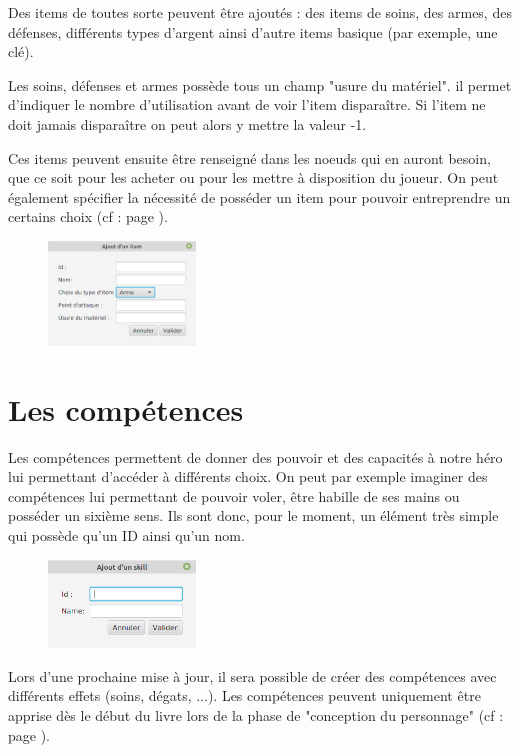 		Des items de toutes sorte peuvent être ajoutés : des items de soins, des armes, des défenses, différents types d'argent ainsi d'autre items basique (par exemple, une clé).

		Les soins, défenses et armes possède tous un champ "usure du matériel". il permet d'indiquer le nombre d'utilisation avant de voir l'item disparaître. Si l'item ne doit jamais disparaître on peut alors y mettre la valeur -1.

		Ces items peuvent ensuite être renseigné dans les noeuds qui en auront besoin, que ce soit pour les acheter ou pour les mettre à disposition du joueur. On peut également spécifier la nécessité de posséder un item pour pouvoir entreprendre un certains choix (cf :  page \pageref{sec:prerequis}).

		\begin{figure}[H]
			\centering\includegraphics[width=0.35\textwidth, keepaspectratio]{img/itemDialog.png}
		\end{figure}

	\section{Les compétences}

		Les compétences permettent de donner des pouvoir et des capacités à notre héro lui permettant d'accéder à différents choix. On peut par exemple imaginer des compétences lui permettant de pouvoir voler, être habille de ses mains ou posséder un sixième sens. Ils sont donc, pour le moment, un élément très simple qui possède qu'un ID ainsi qu'un nom.

		\begin{figure}[H]
			\centering\includegraphics[width=0.35\textwidth, keepaspectratio]{img/skillDialog.png}
		\end{figure}

		Lors d'une prochaine mise à jour, il sera possible de créer des compétences avec différents effets (soins, dégats, ...). Les compétences peuvent uniquement être apprise dès le début du livre lors de la phase de "conception du personnage" (cf :   page \pageref{subsubsec:persoCreationSkill}).
